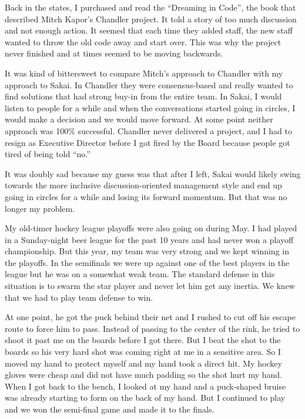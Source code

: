 \documentclass[12pt]{book}
\begin{document}
Back in the states, I purchased and read the ``Dreaming in Code'', the book that
described Mitch Kapor's Chandler project.   It told a story of too much
discussion and not enough action.   It seemed that each time they added staff, the
new staff wanted to throw the old code away and start over.  This was why the
project never finished and at times seemed to be moving backwards.

It was kind of bittersweet to compare Mitch's approach to Chandler with my approach to
Sakai.  In Chandler they were consensus-based and really wanted to find solutions
that had strong buy-in from the entire team. In Sakai, I would listen to people for
a while and when the conversations started going in circles, I would make a decision
and we would move forward.   At some point neither approach was 100\% successful.
Chandler never delivered a project, and I had to resign as Executive Director before I
got fired by the Board because people got tired of being told ``no.''

It was doubly sad because my guess was that after I left, Sakai would likely swing
towards the more inclusive discussion-oriented management style and end up going in
circles for a while and losing its forward momentum.   But that was no longer my
problem.

My old-timer hockey league playoffs were also going on during May.   I had played in
a Sunday-night beer league for the past 10 years and had never won a
playoff championship.   But this year, my team was very strong and we kept winning
in the playoffs.  In the semifinals we were up against one of the best players in
the league but he was on a somewhat weak team.   The standard defense in this situation
is to swarm the star player and never let him get any inertia.   We knew that we had
to play team defense to win.

At one point, he got the puck behind their net and I rushed to cut off his escape route
to force him to pass.  Instead of passing to the center of the rink, he tried to
shoot it past me on the boards before I got there.   But I beat the shot to the
boards so his very hard shot was coming right at me in a sensitive area.   So I
moved my hand to protect myself and my hand took a direct hit.   My hockey gloves were cheap
and did not have much padding so the shot hurt my hand.  When I got back to the bench,
I looked at my hand and a puck-shaped bruise was already starting to form on the back
of my hand.   But I continued to play and we won the semi-final game and made it
to the finals.
\end{document}
